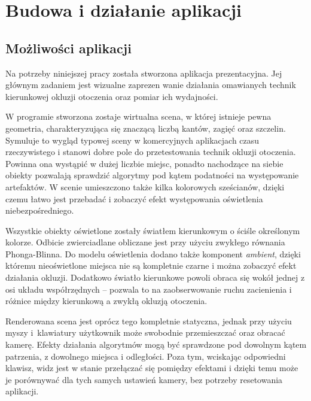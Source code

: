 \chapter{Budowa i działanie aplikacji}
\label{t:budowa}

	\section{Możliwości aplikacji}
	\label{t:budowa:mozliw}
	
	
	Na potrzeby niniejszej pracy została stworzona aplikacja prezentacyjna. Jej głównym zadaniem jest wizualne zaprezen wanie działania omawianych technik kierunkowej okluzji otoczenia oraz pomiar ich wydajności. 
	
	W programie stworzona zostaje wirtualna scena, w której istnieje pewna geometria, charakteryzująca się znaczącą liczbą kantów, zagięć oraz szczelin. Symuluje to wygląd typowej sceny w komercyjnych aplikacjach czasu rzeczywistego i stanowi dobre pole do przetestowania technik okluzji otoczenia. Powinna ona wystąpić w dużej liczbie miejsc, ponadto nachodzące na siebie obiekty pozwalają sprawdzić algorytmy pod kątem podatności na występowanie artefaktów. W scenie umieszczono także kilka kolorowych sześcianów, dzięki czemu łatwo jest przebadać i zobaczyć efekt występowania oświetlenia niebezpośredniego.
	
	Wszystkie obiekty oświetlone zostały światłem kierunkowym o ściśle określonym kolorze. Odbicie zwierciadlane obliczane jest przy użyciu zwykłego równania Phonga-Blinna. Do modelu oświetlenia dodano także komponent \emph{ambient}, dzięki któremu nieoświetlone miejsca nie są kompletnie czarne i można zobaczyć efekt działania okluzji. Dodatkowo światło kierunkowe powoli obraca się wokół jednej z osi układu współrzędnych -- pozwala to na zaobserwowanie ruchu zacienienia i różnice między kierunkową a zwykłą okluzją otoczenia.
	
	Renderowana scena jest oprócz tego kompletnie statyczna, jednak przy użyciu myszy i~klawiatury użytkownik może swobodnie przemieszczać oraz obracać kamerę. Efekty działania algorytmów mogą być sprawdzone pod dowolnym kątem patrzenia, z dowolnego miejsca i odległości. Poza tym, wciskając odpowiedni klawisz, widz jest w stanie przełączać się pomiędzy efektami i dzięki temu może je porównywać dla tych samych ustawień kamery, bez potrzeby resetowania aplikacji.
	
